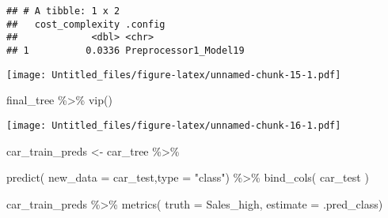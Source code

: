 \documentclass[
]{article}
\newenvironment{Shaded}{\begin{snugshade}}{\end{snugshade}}
\newcommand{\AttributeTok}[1]{\textcolor[rgb]{0.77,0.63,0.00}{#1}}
\newcommand{\FunctionTok}[1]{\textcolor[rgb]{0.00,0.00,0.00}{#1}}
\newcommand{\NormalTok}[1]{#1}
\newcommand{\OtherTok}[1]{\textcolor[rgb]{0.56,0.35,0.01}{#1}}
\newcommand{\SpecialCharTok}[1]{\textcolor[rgb]{0.00,0.00,0.00}{#1}}
\newcommand{\StringTok}[1]{\textcolor[rgb]{0.31,0.60,0.02}{#1}}
\begin{document}
\begin{verbatim}
## # A tibble: 1 x 2
##   cost_complexity .config              
##             <dbl> <chr>                
## 1          0.0336 Preprocessor1_Model19
\end{verbatim}

\begin{Shaded}
\end{Shaded}

\texttt{[image: Untitled\_files/figure-latex/unnamed-chunk-15-1.pdf]}

\begin{Shaded}
\begin{Highlighting}[]
\NormalTok{final\_tree }\SpecialCharTok{\%\textgreater{}\%} \FunctionTok{vip}\NormalTok{()}
\end{Highlighting}
\end{Shaded}

\texttt{[image: Untitled\_files/figure-latex/unnamed-chunk-16-1.pdf]}

\begin{Shaded}
\begin{Highlighting}[]
\NormalTok{car\_train\_preds }\OtherTok{\textless{}{-}}\NormalTok{ car\_tree }\SpecialCharTok{\%\textgreater{}\%}

\FunctionTok{predict}\NormalTok{( }\AttributeTok{new\_data =}\NormalTok{ car\_test,}\AttributeTok{type =} \StringTok{"class"}\NormalTok{) }\SpecialCharTok{\%\textgreater{}\%} \FunctionTok{bind\_cols}\NormalTok{( car\_test )}

\NormalTok{car\_train\_preds }\SpecialCharTok{\%\textgreater{}\%} \FunctionTok{metrics}\NormalTok{( }\AttributeTok{truth =}\NormalTok{ Sales\_high, }\AttributeTok{estimate =}\NormalTok{ .pred\_class)}
\end{Highlighting}
\end{Shaded}
\end{document}
